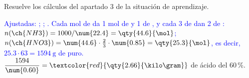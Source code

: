 \begin{exercise}
    Resuelve los cálculos del apartado 3 de la situación de aprendizaje.
    \begin{solu}
        \textcolor{blue}{Ajustadas: ; ;
        . Cada mol de  da 1 mol de  y 1 de , y cada 3 de  dan 2 de
        : \(n(\ch{NH3}) = 1000/\num{22.4} = \qty{44.6}{\mol}\); \(n(\ch{HNO3}) = \num{44.6} \cdot \frac{2}{3} \cdot
        \num{0.85} = \qty{25.3}{\mol}\), es decir, \(\num{25.3} \cdot 63 = \qty{1594}{\gram}\) de  puro.}
        \(\dfrac{1594}{\num{0.60}} = \textcolor{red}{\qty{2.66}{\kilo\gram}}\) de ácido del 60\,\%.
    \end{solu}
\end{exercise}
